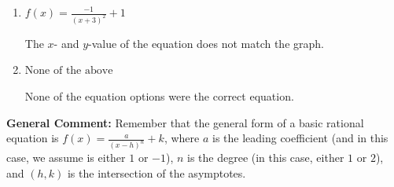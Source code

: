 \documentclass{extbook}[14pt]
\begin{document}
\begin{enumerate}
{\begin{enumerate}[label=\Alph*.]
Corresponds to using the general form $f(x) = \frac{a}{(x-h)^2}+k$, the opposite leading coefficient, AND not noticing the $y$-value was wrong.
\item \( f(x) = \frac{-1}{(x + 3)^2} + 1 \)

The $x$- and $y$-value of the equation does not match the graph.
\item \( \text{None of the above} \)

None of the equation options were the correct equation.
\end{enumerate}

\textbf{General Comment:} Remember that the general form of a basic rational equation is $ f(x) = \frac{a}{(x-h)^n} + k$, where $a$ is the leading coefficient (and in this case, we assume is either $1$ or $-1$), $n$ is the degree (in this case, either $1$ or $2$), and $(h, k)$ is the intersection of the asymptotes.
}
\end{enumerate}
\end{document}
